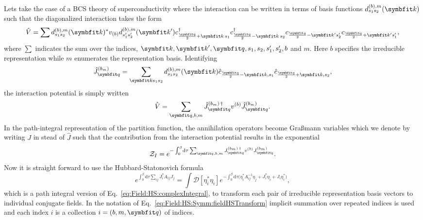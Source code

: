 Lets take the case of a BCS theory of superconductivity where the interaction can be written in terms of
basis functions $d^{(b),m}_{s_1s_2}(\v{k})$ such that the diagonalized interaction takes the form
\begin{equation}
    \label{eq:Field:HS:Symm:diagonalizedV}
    \hat{V} = \sum d^{(b),m}_{s_1s_2}(\v{k})^\ast v_{(b)}d^{(b),m}_{s_1's_2'}(\v{k}') c_{\frac{\v{q}}{2}+\v{k}\,s_1}^\dagger c_{\frac{\v{q}}{2}-\v{k}\,s_2}^\dagger c_{\frac{\v{q}}{2}-\v{k}'s_2'}c_{\frac{\v{q}}{2}+\v{k}'s_1'},
\end{equation}
where $\sum$ indicates the sum over the indices, $\v{k}, \v{k}', \v{q}, s_1, s_2, s_1', s_2', b$ and $m$. Here $b$ specifies the irreducible representation
while $m$ enumerates the representation basis.
Identifying
\begin{equation}
    \label{eq:Field:HS:Symm:identification}
    \hat{J}_\v{q}^{(b_m)} = \sum_{\v{k}s_1s_2}d^{(b),m}_{s_1s_2}(\v{k})\hat{c}_{\frac{\v{q}}{2}-\v{k},s_1}\hat{c}_{\frac{\v{q}}{2}+\v{k},s_2},
\end{equation}
the interaction potential is simply written
\begin{equation}
    \label{eq:Field:HS:Symm:HSpreparedV}
    \hat{V} = \sum_{\v{q},b,m}\hat{J}_\v{q}^{(b_m)\,\dagger}v^{(b)}\hat{J}_\v{q}^{(b_m)}.
\end{equation}
In the path-integral representation of the partition function, the annihilation operators become Gra\ss mann variables which we denote
by writing $J$ in stead of $\hat{J}$ such that the contribution from the interaction potential results in the exponential
\begin{equation}
    \label{eq:Field:HS:Symm:potentialExp}
    \mathcal{Z}_I = e^{-\int_0^\beta\!\mathrm{d}\tau\sum_{\v{q},b,m}J_\v{q}^{(b_m)\,\dagger}v^{(b)}J_\v{q}^{(b_m)}}.
\end{equation}
Now it is straight forward to use the Hubbard-Statonovich formula
\begin{equation}
    \label{eq:Field:HS:Symm:fieldHSTransform}
    e^{\int_0^\beta\!\mathrm{d}\tau\sum_{ij} J_i^\ast A_{ij}J_{j}} = \int\!\mathcal{D}[\eta_i^\ast\eta_i]e^{-\int_0^\beta\!\mathrm{d}\tau\big(\eta_i^\ast A^{-1}_{ij}\eta_j + J_i^\ast\eta_i+J_i\eta_i^\ast\big)},
\end{equation}
which is a path integral version of Eq.~\eqref{eq:Field:HS:complexIntegral}, to transform each pair of irreducible representation basis vectors to
individual conjugate fields. In the notation of Eq.~\eqref{eq:Field:HS:Symm:fieldHSTransform} implicit summation over repeated indices is used and each index $i$ is a collection $i = (b,m,\v{q})$ of indices.
